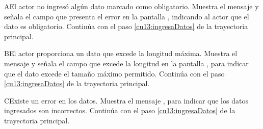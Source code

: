   
 \begin{UCtrayectoriaA}{A}{El actor no ingresó algún dato marcado como obligatorio.}
    \UCpaso[\UCsist] Muestra el mensaje  y señala el campo que presenta el error en la pantalla 
	    , indicando al actor que el dato es obligatorio.
    \UCpaso[] Continúa con el paso \ref{cu13:ingresaDatos} de la trayectoria principal.
 \end{UCtrayectoriaA}

 \begin{UCtrayectoriaA}{B}{El actor proporciona un dato que excede la longitud máxima.}
    \UCpaso[\UCsist] Muestra el mensaje  y señala el campo que excede la 
    longitud en la pantalla , para indicar que el dato excede el tamaño máximo permitido.
    \UCpaso[] Continúa con el paso \ref{cu13:ingresaDatos} de la trayectoria principal.
 \end{UCtrayectoriaA}
 \begin{UCtrayectoriaA}{C}{Existe un error en los datos.}
    \UCpaso[\UCsist] Muestra el mensaje , para indicar que los datos ingresados son incorrectos.
    \UCpaso[] Continúa con el paso \ref{cu13:ingresaDatos} de la trayectoria principal.
 \end{UCtrayectoriaA}